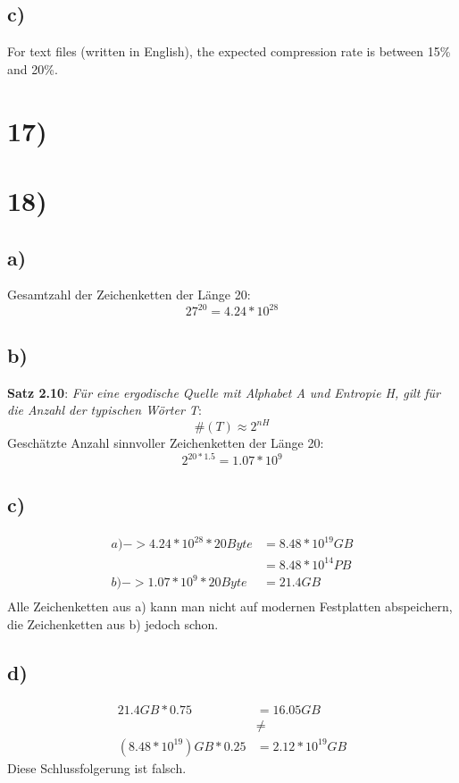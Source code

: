   \subsection*{c)}

  For text files (written in English), the expected compression rate is between 15\% and 20\%.

  \section*{17)}
  \section*{18)}

    \subsection*{a)}

      Gesamtzahl der Zeichenketten der Länge 20:\\
      \[27^{20} = 4.24 * 10^{28} \]

    \subsection*{b)}

      \textbf{Satz 2.10}: \textit{Für eine ergodische Quelle mit Alphabet A und Entropie H, gilt für die Anzahl der typischen Wörter T}:
      \[ \#(T) \approx 2^{nH} \]
      \newline
      Geschätzte Anzahl sinnvoller Zeichenketten der Länge 20:
      \[ 2^{20*1.5} = 1.07 * 10^{9} \]

    \subsection*{c)}

      \begin{equation}
      	\begin{split}
      	  a) -> 4.24 * 10^{28} * 20Byte & = 8.48 * 10^{19} GB \\
      	  & = 8.48 * 10^{14} PB \\
      	  b) -> 1.07 * 10^{9} * 20Byte & = 21.4 GB \\
      	\end{split}
      \end{equation}
      \newline
      Alle Zeichenketten aus a) kann man nicht auf modernen Festplatten abspeichern, die Zeichenketten aus b) jedoch schon.\\

    \subsection*{d)}

      \begin{equation}
      	\begin{split}
      	  21.4 GB * 0.75 & = 16.05 GB \\
      	  & \neq \\
      	  (8.48 * 10^{19}) GB * 0.25 & = 2.12 * 10^{19} GB
      	\end{split}
      \end{equation}
      \newline
      Diese Schlussfolgerung ist falsch.



